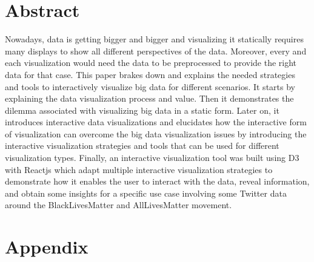 \documentclass[svgnames]{article}
\begin{document}
\tableofcontents
\newpage

\section{Abstract}

Nowadays, data is getting bigger and bigger and visualizing it statically requires many displays to show all different perspectives of the data. Moreover, every and each visualization would need the data to be preprocessed to provide the right data for that case. This paper brakes down and explains the needed strategies and tools to interactively visualize big data for different scenarios. It starts by explaining the data visualization process and value. Then it demonstrates the dilemma associated with visualizing big data in a static form. Later on, it introduces interactive data visualizations and elucidates how the interactive form of visualization can overcome the big data visualization issues by introducing the interactive visualization strategies and tools that can be used for different visualization types. Finally, an interactive visualization tool \cite{d3tool} was built using D3 with Reactjs which adapt multiple interactive visualization strategies to demonstrate how it enables the user to interact with the data, reveal information, and obtain some insights for a specific use case involving some Twitter data around the BlackLivesMatter and AllLivesMatter movement.


\newpage

\newpage

\newpage

\newpage

\newpage

\newpage

\newpage







\newpage
\section{Appendix}



\end{document}
